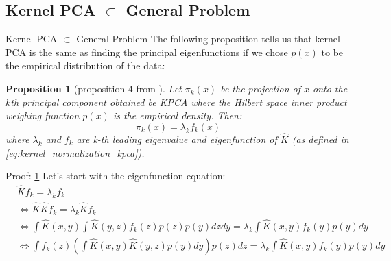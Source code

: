 \documentclass[aspectratio=169]{beamer}
\newtheorem{prop}{Proposition}
\begin{document}
\subsection{Kernel PCA \texorpdfstring{$\subset$}{TEXT} General Problem}
\begin{frame}{Kernel PCA \texorpdfstring{$\subset$}{TEXT} General Problem}
  The following proposition tells us that kernel PCA is the same as finding the principal eigenfunctions if we chose $p(x)$ to be the empirical distribution of the data:
  \begin{prop}[proposition 4 from \cite{bengio2003learning}] \label{prop:kpca}
  Let $\pi_{k}(x)$ be the projection of $x$ onto the $k$th principal component obtained be KPCA where the Hilbert space inner product weighing function $p(x)$ is the empirical density. Then:
  \begin{equation*}
    \pi_{k} (x) = \lambda_{k} f_{k} (x)
  \end{equation*}  
  where $\lambda_{k}$ and $f_{k}$ are k-th leading eigenvalue and eigenfunction of $\hat{K}$ (as defined in \cref{eq:kernel_normalization_kpca}). 
  \end{prop}
\end{frame}

\begin{frame}{Proof: \cref{prop:kpca}}
  Let's start with the eigenfunction equation:
  \begin{align*}
    &{} \hat{K} f_{k} = \lambda_{k} f_{k} \\
    & \iff \hat{K} \hat{K} f_{k} = \lambda_{k} \hat{K} f_{k} \\
    & \iff \int \hat{K}(x,y) \int \hat{K}(y,z) f_{k}(z) p(z) p(y) dz dy = \lambda_{k} \int \hat{K}(x,y) f_{k}(y) p(y) dy \\
    & \iff \int f_{k}(z) (\int \hat{K}(x,y) \hat{K}(y,z) p(y) dy) p(z) dz = \lambda_{k} \int \hat{K}(x,y) f_{k}(y) p(y) dy \\ 
  \end{align*}
\end{frame}
\end{document}
